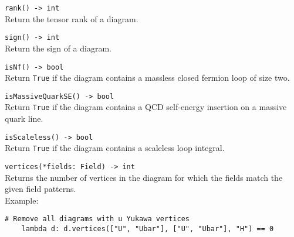 \begin{basedescript}{\desclabelstyle{\pushlabel}}
   \item[\hspace{-1em}]\colorbox{gray!30}{\lstinline[style=pykw]|rank() -> int|} \vspace{0.1cm}\\
   Return the tensor rank of a diagram.

   \item[\hspace{-1em}]\colorbox{gray!30}{\lstinline[style=pykw]|sign() -> int|} \vspace{0.1cm}\\
   Return the sign of a diagram.

   \item[\hspace{-1em}]\colorbox{gray!30}{\lstinline[style=pykw]|isNf() -> bool|} \vspace{0.1cm}\\
   Return \texttt{True} if the diagram contains a massless closed fermion loop of size two.

   \item[\hspace{-1em}]\colorbox{gray!30}{\lstinline[style=pykw]|isMassiveQuarkSE() -> bool|} \vspace{0.1cm}\\
   Return \texttt{True} if the diagram contains a QCD self-energy insertion on a massive quark line.

   \item[\hspace{-1em}]\colorbox{gray!30}{\lstinline[style=pykw]|isScaleless() -> bool|} \vspace{0.1cm}\\
   Return \texttt{True} if the diagram contains a scaleless loop integral.

   \item[\hspace{-1em}]\colorbox{gray!30}{\lstinline[style=pykw]|vertices(*fields: Field) -> int|} \vspace{0.1cm}\\
   Returns the number of vertices in the diagram for which the fields match the given field patterns. \vspace{0.1cm} \\
   Example:
   \begin{lstlisting}[style=pykw]
    # Remove all diagrams with u Yukawa vertices
    lambda d: d.vertices(["U", "Ubar"], ["U", "Ubar"], "H") == 0
   \end{lstlisting}


\end{basedescript}
